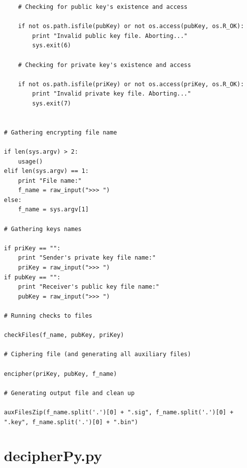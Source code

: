 \documentclass[a4paper,11pt,openright,oneside]{report}
\begin{document}
\begin{verbatim}
    # Checking for public key's existence and access

    if not os.path.isfile(pubKey) or not os.access(pubKey, os.R_OK):
        print "Invalid public key file. Aborting..."
        sys.exit(6)

    # Checking for private key's existence and access

    if not os.path.isfile(priKey) or not os.access(priKey, os.R_OK):
        print "Invalid private key file. Aborting..."
        sys.exit(7)


# Gathering encrypting file name

if len(sys.argv) > 2:
    usage()
elif len(sys.argv) == 1:
    print "File name:"
    f_name = raw_input(">>> ")
else:
    f_name = sys.argv[1]

# Gathering keys names

if priKey == "":
    print "Sender's private key file name:"
    priKey = raw_input(">>> ")
if pubKey == "":
    print "Receiver's public key file name:"
    pubKey = raw_input(">>> ")

# Running checks to files

checkFiles(f_name, pubKey, priKey)

# Ciphering file (and generating all auxiliary files)

encipher(priKey, pubKey, f_name)

# Generating output file and clean up

auxFilesZip(f_name.split('.')[0] + ".sig", f_name.split('.')[0] + ".key", f_name.split('.')[0] + ".bin")
\end{verbatim}

\newpage
\section{decipherPy.py}
\label{App:decipher.py}
\end{document}
